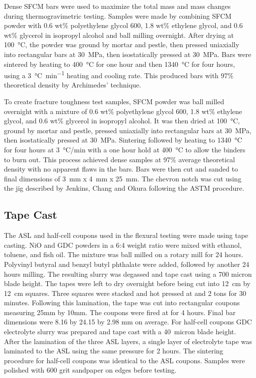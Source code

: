        Dense SFCM bars were used to maximize the total mass and mass changes during thermogravimetric testing.
        Samples were made by combining SFCM powder with 0.6 wt\% polyethylene glycol 600, 1.8 wt\% ethylene glycol, and 0.6 wt\% glycerol in isopropyl alcohol and ball milling overnight.
        After drying at \SI{100}{\celsius}, the powder was ground by mortar and pestle, then pressed uniaxially into rectangular bars at \SI{30}{\mega\pascal}, then isostatically pressed at \SI{30}{\mega\pascal}.
        Bars were sintered by heating to \SI{400}{\celsius} for one hour and then \SI{1340}{\celsius} for four hours, using a \SI{3}{\celsius\per\minute} heating and cooling rate.
        This produced bars with 97\% theoretical density by Archimedes' technique.

        To create fracture toughness test samples, SFCM powder was ball milled overnight with a mixture of 0.6 wt\% polyethylene glycol 600, 1.8 wt\% ethylene glycol, and 0.6 wt\% glycerol in isopropyl alcohol.
        It was then dried at \SI{100}{\celsius}, ground by mortar and pestle, pressed uniaxially into rectangular bars at \SI{30}{\mega\pascal}, then isostatically pressed at \SI{30}{\mega\pascal}.
        Sintering followed by heating to \SI{1340}{\celsius} for four hours at \SI{3}{\celsius/min}  with a one hour hold at \SI{400}{\celsius} to allow the binders to burn out.
        This process achieved dense samples at 97\% average theoretical density with no apparent flaws in the bars.
        Bars were then cut and sanded to final dimensions of \SI{3}{mm} x \SI{4}{mm} x \SI{25}{mm}.
        The chevron notch was cut using the jig described by Jenkins, Chang and Okura following the ASTM procedure.\cite{Jenkins1988, ASTM2016a}

    \subsection{Tape Cast}
        The ASL and half-cell coupons used in the flexural testing were made using tape casting.
        NiO and GDC powders in a 6:4 weight ratio were mixed with ethanol, toluene, and fish oil.
        The mixture was ball milled on a rotary mill for 24 hours.
        Polyvinyl butyral and benzyl butyl phthalate were added, followed by another 24 hours milling.
        The resulting slurry was degassed and tape cast using a 700 micron blade height.
        The tapes were left to dry overnight before being cut into \SI{12}{\centi\meter} by \SI{12}{\centi\meter} squares.
        Three squares were stacked and hot pressed at  and 2 tons for 30 minutes.
        Following this lamination, the tape was cut into rectangular coupons measuring 25mm by 10mm.
        The coupons were fired at  for 4 hours.
        Final bar dimensions were 8.16 by 24.15 by 2.98 mm on average.
        For half-cell coupons GDC electrolyte slurry was prepared and tape cast with a \SI{40}{micron} blade height.
        After the lamination of the three ASL layers, a single layer of electrolyte tape was laminated to the ASL using the same pressure for 2 hours.
        The sintering procedure for half-cell coupons was identical to the ASL coupons.
        Samples were polished with 600 grit sandpaper on edges before testing.

